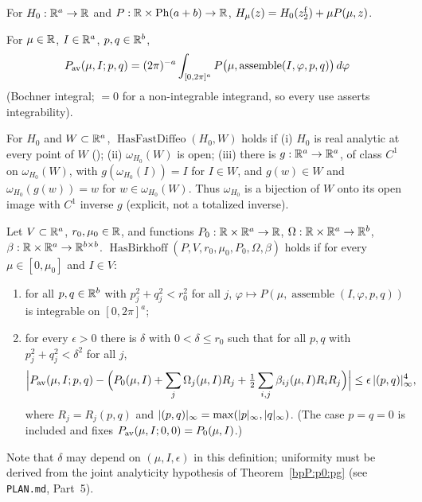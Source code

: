 \begin{definition}\label{bpP:p0:degham}
For $H_0:\mathbb{R}^a\to\mathbb{R}$ and $P:\mathbb{R}\times\mathrm{Ph}(a+b)\to\mathbb{R}$, $H_\mu(z)=H_0(z_2^{\rm f})+\mu P(\mu,z)$.
\end{definition}

\begin{definition}\label{bpP:p0:secavg}
For $\mu\in\mathbb{R}$, $I\in\mathbb{R}^a$, $p,q\in\mathbb{R}^b$,
\[P_{\rm av}(\mu,I;p,q)=(2\pi)^{-a}\int_{[0,2\pi]^a}P\bigl(\mu,\operatorname{assemble}(I,\varphi,p,q)\bigr)\,d\varphi\]
(Bochner integral; $=0$ for a non-integrable integrand, so every use asserts integrability).
\end{definition}

\begin{definition}\label{bpP:p0:fastdiffeo}
For $H_0$ and $W\subset\mathbb{R}^a$, $\operatorname{HasFastDiffeo}(H_0,W)$ holds if (i) $H_0$ is real analytic at every point of $W$
(); (ii) $\omega_{H_0}(W)$ is open; (iii) there is $g:\mathbb{R}^a\to\mathbb{R}^a$, of class $C^1$ on $\omega_{H_0}(W)$,
with $g(\omega_{H_0}(I))=I$ for $I\in W$, and $g(w)\in W$ and $\omega_{H_0}(g(w))=w$ for $w\in\omega_{H_0}(W)$.
Thus $\omega_{H_0}$ is a bijection of $W$ onto its open image with $C^1$ inverse $g$ (explicit, not a totalized inverse).
\end{definition}

\begin{definition}\label{bpP:p0:birkhoff}
Let $V\subset\mathbb{R}^a$, $r_0,\mu_0\in\mathbb{R}$, and functions $P_0:\mathbb{R}\times\mathbb{R}^a\to\mathbb{R}$, $\Omega:\mathbb{R}\times\mathbb{R}^a\to\mathbb{R}^b$,
$\beta:\mathbb{R}\times\mathbb{R}^a\to\mathbb{R}^{b\times b}$. $\operatorname{HasBirkhoff}(P,V,r_0,\mu_0,P_0,\Omega,\beta)$ holds if for every
$\mu\in[0,\mu_0]$ and $I\in V$:
\begin{enumerate}[label=(\roman*)]
\item for all $p,q\in\mathbb{R}^b$ with $p_j^2+q_j^2<r_0^2$ for all $j$, $\varphi\mapsto P(\mu,\operatorname{assemble}(I,\varphi,p,q))$
  is integrable on $[0,2\pi]^a$;
\item for every $\epsilon>0$ there is $\delta$ with $0<\delta\le r_0$ such that for all $p,q$ with $p_j^2+q_j^2<\delta^2$ for all $j$,
\[\Bigl\lvert P_{\rm av}(\mu,I;p,q)-\Bigl(P_0(\mu,I)+\sum_j\Omega_j(\mu,I)R_j+\tfrac12\sum_{i,j}\beta_{ij}(\mu,I)R_iR_j\Bigr)\Bigr\rvert
\le\epsilon\,\lvert (p,q)\rvert_\infty^4,\]
where $R_j=R_j(p,q)$ and $\lvert (p,q)\rvert_\infty=\max(\lvert p\rvert_\infty,\lvert q\rvert_\infty)$. (The case $p=q=0$ is included and fixes $P_{\rm av}(\mu,I;0,0)=P_0(\mu,I)$.)
\end{enumerate}
Note that $\delta$ may depend on $(\mu,I,\epsilon)$ in this definition; uniformity must be derived from the joint analyticity
hypothesis of Theorem~\ref{bpP:p0:pg} (see \texttt{PLAN.md}, Part~5).
\end{definition}

